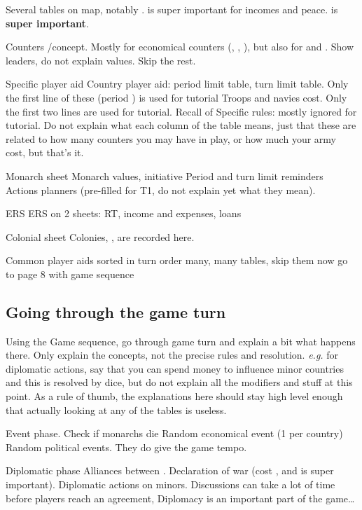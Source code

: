 \aparag \STAB
\bparag Several tables on \ROTW map, notably \STAB.
\bparag \STAB is super important for incomes and peace.
\bparag \STAB is \textbf{super important}.

\aparag Counters
\bparag \Faceplus/\facemoins concept. Mostly for economical counters (\COL,
\TP, \TradeFLEET), but also for \ARMY and \FLEET.
\bparag Show leaders, do not explain values.
\bparag Skip the rest.

\aparag Specific player aid
\bparag Country player aid: period limit table, turn limit table. Only the
first line of these (period ) is used for tutorial
\bparag Troops and navies cost. Only the first two lines are used for tutorial.
\bparag Recall of Specific rules: mostly ignored for tutorial.
\bparag Do not explain what each column of the table means, just that these
are related to how many counters you may have in play, or how much your army
cost, but that's it.

\aparag Monarch sheet
\bparag Monarch values, initiative
\bparag Period and turn limit reminders
\bparag Actions planners (pre-filled for T1, do not explain yet what they
mean).

\aparag ERS
 ERS on 2 sheets: RT, income and expenses, loans

\aparag Colonial sheet
\bparag Colonies, \TP, \TradeFLEET are recorded here.

\aparag Common player aids
\bparag sorted in turn order
\bparag many, many tables, skip them now
\bparag go to page 8 with game sequence

\subsection{Going through the game turn}
\aparag Using the Game sequence, go through game turn and explain a bit what
happens there.
\bparag Only explain the concepts, not the precise rules and resolution.
\bparag \emph{e.g.} for diplomatic actions, say that you can spend money to
influence minor countries and this is resolved by dice, but do not explain all
the modifiers and stuff at this point. As a rule of thumb, the explanations
here should stay high level enough that actually looking at any of the tables
is useless.

\aparag Event phase.
\bparag Check if monarchs die
\bparag Random economical event (1 per country)
\bparag Random political events. They do give the game tempo.

\aparag Diplomatic phase
\bparag Alliances between \MAJ.
\bparag Declaration of war (cost \STAB, and \STAB is super important).
\bparag Diplomatic actions on minors.
\bparag Discussions can take a lot of time before players reach an agreement,
Diplomacy is an important part of the game\ldots

